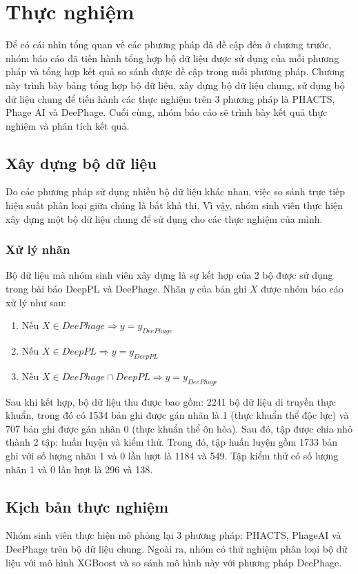 \chapter{Thực nghiệm}
Để có cái nhìn tổng quan về các phương pháp đã đề cập đến ở chương trước, nhóm báo cáo đã tiến hành tổng hợp bộ dữ liệu được sử dụng của mỗi phương pháp và tổng hợp kết quả so sánh được đề cập trong mỗi phương pháp. Chương này trình bày bảng tổng hợp bộ dữ liệu, xây dựng bộ dữ liệu chung, sử dụng bộ dữ liệu chung để tiến hành các thực nghiệm trên 3 phương pháp là PHACTS, Phage AI và DeePhage. Cuối cùng, nhóm báo cáo sẽ trình bày kết quả thực nghiệm và phân tích kết quả.

\section{Xây dựng bộ dữ liệu}
Do các phương pháp sử dụng nhiều bộ dữ liệu khác nhau, việc so sánh trực tiếp hiệu suất phân loại giữa chúng là bất khả thi. Vì vậy, nhóm sinh viên thực hiện xây dựng một bộ dữ liệu chung để sử dụng cho các thực nghiệm của mình.
\subsection{ Xử lý nhãn }
Bộ dữ liệu mà nhóm sinh viên xây dựng là sự kết hợp của 2 bộ được sử dụng trong bài báo DeepPL và DeePhage. Nhãn $y$ của bản ghi $X$ được nhóm báo cáo xử lý như sau:
\begin{enumerate}
    \item Nếu $X \in DeePhage \Rightarrow y = y_{DeePhage}$ 
    \item Nếu $X \in DeepPL \Rightarrow y = y_{DeepPL}$
    \item Nếu $X \in DeePhage \cap DeepPL \Rightarrow y = y_{DeePhage}$
\end{enumerate}
Sau khi kết hợp, bộ dữ liệu thu được bao gồm: 2241 bộ dữ liệu di truyền thực khuẩn, trong đó có 1534 bản ghi được gán nhãn là 1 (thực khuẩn thể độc lực) và 707 bản ghi được gán nhãn 0 (thực khuẩn thể ôn hòa). Sau đó, tập được chia nhỏ thành 2 tập: huấn luyện và kiểm thử. Trong đó, tập huấn luyện gồm 1733 bản ghi với số lượng nhãn 1 và 0 lần lượt là 1184 và 549. Tập kiểm thử có số lượng nhãn 1 và 0 lần lượt là 296 và 138.

\section{Kịch bản thực nghiệm}\label{ kịch bản thực nghiệm}
Nhóm sinh viên thực hiện mô phỏng lại 3 phương pháp: PHACTS, PhageAI và DeePhage trên bộ dữ liệu chung. Ngoài ra, nhóm có thử nghiệm phân loại bộ dữ liệu với mô hình XGBoost và so sánh mô hình này với phương pháp DeePhage.

